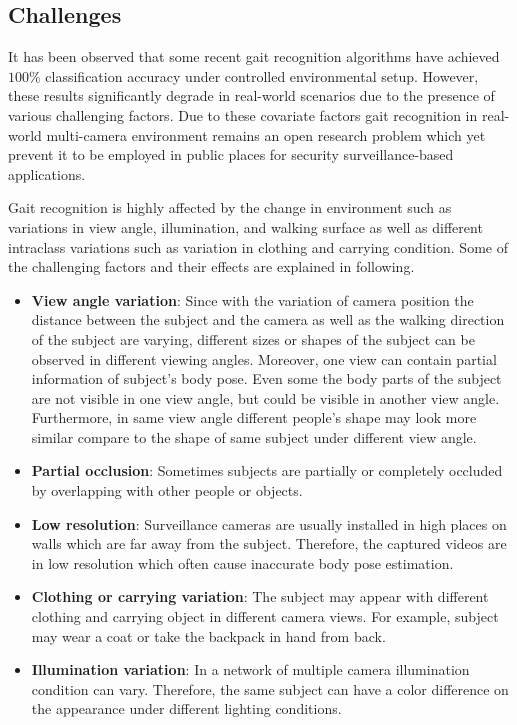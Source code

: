 \subsection{Challenges}
It has been observed that some recent gait recognition algorithms have achieved $100\%$ classification accuracy under controlled environmental setup. However, these results significantly degrade in real-world scenarios due to the presence of various challenging factors. Due to these covariate factors gait recognition in real-world multi-camera environment remains an open research problem which yet prevent it to be employed in public places for security surveillance-based applications. 

Gait recognition is highly affected by the change in environment such as variations in view angle, illumination, and walking surface as well as different intraclass variations such as variation in clothing and carrying condition. Some of the challenging factors and their effects are explained in following.
\begin{itemize}
	\item \textbf{View angle variation}: Since with the variation of camera position the distance between the subject and the camera as well as the walking direction of the subject are varying, different sizes or shapes of the subject can be observed in different viewing angles. Moreover, one view can contain partial information of subject's body pose. Even some the body parts of the subject are not visible in one view angle, but could be visible in another view angle. Furthermore, in same view angle different people's shape may look more similar compare to the shape of same subject under different view angle. 
	
	\item \textbf{Partial occlusion}: Sometimes subjects are partially or completely occluded by overlapping with other people or objects. 
	
	\item \textbf{Low resolution}: Surveillance cameras are usually installed in high places on walls which are far away from the subject. Therefore, the captured videos are in low resolution which often cause inaccurate body pose estimation.
	
	\item \textbf{Clothing or carrying variation}: The subject may appear with different clothing and carrying object in different camera views. For example, subject may wear a coat or take the backpack in hand from back.
	
	\item \textbf{Illumination variation}: In a network of multiple camera illumination condition can vary. Therefore, the same subject can have a color difference on the appearance under different lighting conditions. 
\end{itemize}

